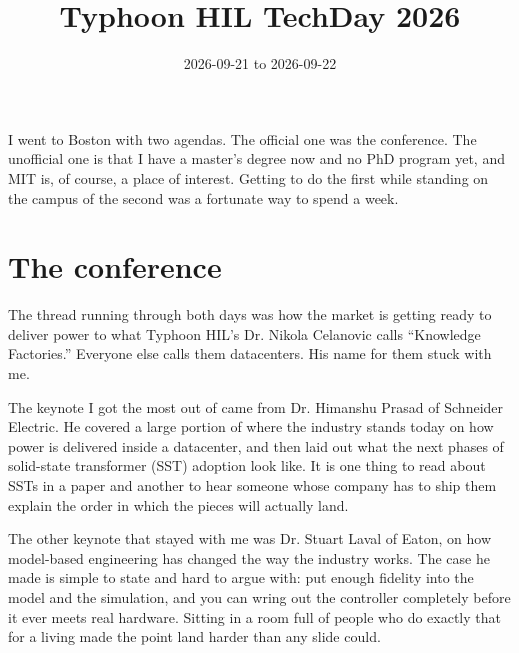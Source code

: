 
\title{Typhoon HIL TechDay 2026}
\date{2026-09-21 to 2026-09-22}




I went to Boston with two agendas. The official one was the conference. The
unofficial one is that I have a master's degree now and no PhD program yet,
and MIT is, of course, a place of interest. Getting to do the first while
standing on the campus of the second was a fortunate way to spend a week.

\section{The conference}

The thread running through both days was how the market is getting ready to
deliver power to what Typhoon HIL's Dr. Nikola Celanovic calls ``Knowledge
Factories.'' Everyone else calls them datacenters. His name for them stuck
with me.


The keynote I got the most out of came from Dr. Himanshu Prasad of Schneider
Electric. He covered a large portion of where the industry stands today on
how power is delivered inside a datacenter, and then laid out what the next
phases of solid-state transformer (SST) adoption look like. It is one thing
to read about SSTs in a paper and another to hear someone whose company has
to ship them explain the order in which the pieces will actually land.

The other keynote that stayed with me was Dr. Stuart Laval of Eaton, on how
model-based engineering has changed the way the industry works. The case he
made is simple to state and hard to argue with: put enough fidelity into the
model and the simulation, and you can wring out the controller completely
before it ever meets real hardware. Sitting in a room full of people who do
exactly that for a living made the point land harder than any slide could.

